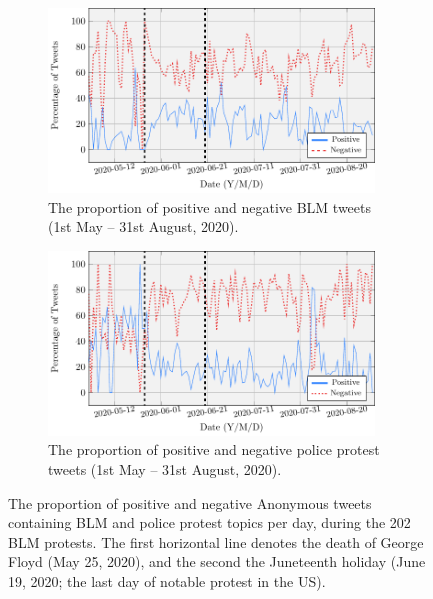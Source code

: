 \documentclass[letterpaper]{article}
\begin{document}
\begin{figure}[!htp]
\centering
\begin{subfigure}[b]{0.45\textwidth}
    \centering
    \includegraphics[width=0.95\textwidth]{blm_sentiment.pdf}
    \caption{The proportion of positive and negative BLM tweets (1st May -- 31st August, 2020).}
    \label{fig:avgSentimentsBLM}
\end{subfigure}
\quad
\begin{subfigure}[b]{0.45\textwidth}
     \centering
     \includegraphics[width=0.95\textwidth]{police_sentiment.pdf}
     \caption{The proportion of positive and negative police protest tweets (1st May -- 31st August, 2020).}
     \label{fig:avgSentimentsPolice}
\end{subfigure}
\caption{The proportion of positive and negative Anonymous tweets containing BLM and police protest topics per day, during the 202 BLM protests. The first horizontal line denotes the death of George Floyd (May 25, 2020), and the second the Juneteenth holiday (June 19, 2020; the last day of notable protest in the US).}
\label{fig:avgSentimentsFiltered}
\end{figure}
\end{document}
